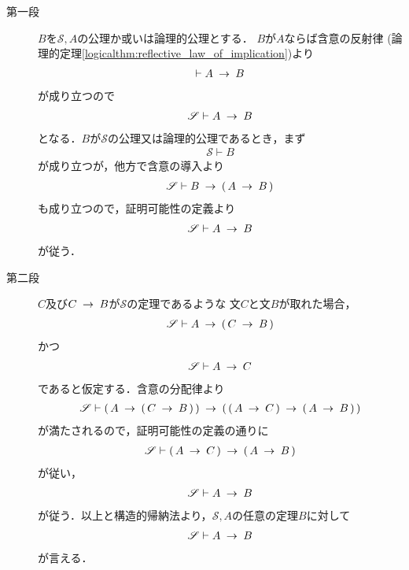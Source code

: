 	\begin{metaprf}\mbox{}
		\begin{description}
			\item[第一段]
				$B$を$\mathscr{S},A$の公理か或いは論理的公理とする．
				$B$が$A$ならば含意の反射律
				(論理的定理\ref{logicalthm:reflective_law_of_implication})より
				\begin{align}
					\vdash A \hspace{0.25em}\rightarrow\hspace{0.25em} B
				\end{align}
				が成り立つので
				\begin{align}
					\mathscr{S} \vdash A \hspace{0.25em}\rightarrow\hspace{0.25em} B
				\end{align}
				となる．$B$が$\mathscr{S}$の公理又は論理的公理であるとき，まず
				\begin{align}
					\mathscr{S} \vdash B
				\end{align}
				が成り立つが，他方で含意の導入より
				\begin{align}
					\mathscr{S} \vdash B \hspace{0.25em}\rightarrow\hspace{0.25em} (\, A \hspace{0.25em}\rightarrow\hspace{0.25em} B\, ) 
				\end{align}
				も成り立つので，証明可能性の定義より
				\begin{align}
					\mathscr{S} \vdash A \hspace{0.25em}\rightarrow\hspace{0.25em} B
				\end{align}
				が従う．
				
			\item[第二段]
				$C$及び$C \hspace{0.25em}\rightarrow\hspace{0.25em} B$が$\mathscr{S}$の定理であるような
				文$C$と文$B$が取れた場合，
				\begin{align}
					\mathscr{S} \vdash A \hspace{0.25em}\rightarrow\hspace{0.25em} (\, C \hspace{0.25em}\rightarrow\hspace{0.25em} B\, )
				\end{align}
				かつ
				\begin{align}
					\mathscr{S} \vdash A \hspace{0.25em}\rightarrow\hspace{0.25em} C
				\end{align}
				であると仮定する．含意の分配律より
				\begin{align}
					\mathscr{S} \vdash 
					(\, A \hspace{0.25em}\rightarrow\hspace{0.25em} (\, C \hspace{0.25em}\rightarrow\hspace{0.25em} B\, )\, ) 
					\hspace{0.25em}\rightarrow\hspace{0.25em} (\, (\, A \hspace{0.25em}\rightarrow\hspace{0.25em} C\, ) \hspace{0.25em}\rightarrow\hspace{0.25em} (\, A \hspace{0.25em}\rightarrow\hspace{0.25em} B\, )\, )
				\end{align}
				が満たされるので，証明可能性の定義の通りに
				\begin{align}
					\mathscr{S} \vdash (\, A \hspace{0.25em}\rightarrow\hspace{0.25em} C\, ) 
					\hspace{0.25em}\rightarrow\hspace{0.25em} (\, A \hspace{0.25em}\rightarrow\hspace{0.25em} B\, )
				\end{align}
				が従い，
				\begin{align}
					\mathscr{S} \vdash A \hspace{0.25em}\rightarrow\hspace{0.25em} B
				\end{align}
				が従う．以上と構造的帰納法より，$\mathscr{S},A$の任意の定理$B$に対して
				\begin{align}
					\mathscr{S} \vdash A \hspace{0.25em}\rightarrow\hspace{0.25em} B
				\end{align}
				が言える．
				\QED
		\end{description}
	\end{metaprf}
	
